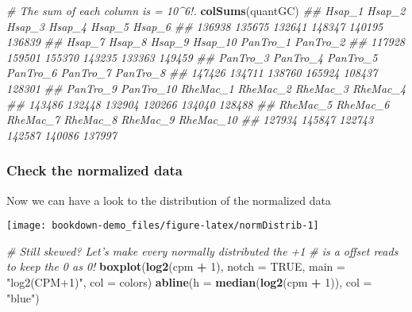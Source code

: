 \documentclass[]{book}
\newenvironment{Shaded}{\begin{snugshade}}{\end{snugshade}}
\newcommand{\CommentTok}[1]{\textcolor[rgb]{0.56,0.35,0.01}{\textit{#1}}}
\newcommand{\DataTypeTok}[1]{\textcolor[rgb]{0.13,0.29,0.53}{#1}}
\newcommand{\DecValTok}[1]{\textcolor[rgb]{0.00,0.00,0.81}{#1}}
\newcommand{\KeywordTok}[1]{\textcolor[rgb]{0.13,0.29,0.53}{\textbf{#1}}}
\newcommand{\NormalTok}[1]{#1}
\newcommand{\OperatorTok}[1]{\textcolor[rgb]{0.81,0.36,0.00}{\textbf{#1}}}
\newcommand{\OtherTok}[1]{\textcolor[rgb]{0.56,0.35,0.01}{#1}}
\newcommand{\StringTok}[1]{\textcolor[rgb]{0.31,0.60,0.02}{#1}}
\begin{document}
\begin{Shaded}
\begin{Highlighting}[]
\CommentTok{# The sum of each column is = 10^6!.}
\KeywordTok{colSums}\NormalTok{(quantGC)}
\CommentTok{##    Hsap_1    Hsap_2    Hsap_3    Hsap_4    Hsap_5    Hsap_6 }
\CommentTok{##    136938    135675    132641    148347    140195    136839 }
\CommentTok{##    Hsap_7    Hsap_8    Hsap_9   Hsap_10  PanTro_1  PanTro_2 }
\CommentTok{##    117928    159501    155370    143235    133363    149459 }
\CommentTok{##  PanTro_3  PanTro_4  PanTro_5  PanTro_6  PanTro_7  PanTro_8 }
\CommentTok{##    147426    134711    138760    165924    108437    128301 }
\CommentTok{##  PanTro_9 PanTro_10  RheMac_1  RheMac_2  RheMac_3  RheMac_4 }
\CommentTok{##    143486    132448    132904    120266    134040    128488 }
\CommentTok{##  RheMac_5  RheMac_6  RheMac_7  RheMac_8  RheMac_9 RheMac_10 }
\CommentTok{##    127934    145847    122743    142587    140086    137997}
\end{Highlighting}
\end{Shaded}

\hypertarget{check-the-normalized-data}{%
\subsubsection{Check the normalized data}\label{check-the-normalized-data}}

Now we can have a look to the distribution of the normalized data

\begin{Shaded}
\end{Shaded}

\begin{center}\texttt{[image: bookdown-demo\_files/figure-latex/normDistrib-1]} \end{center}

\begin{Shaded}
\begin{Highlighting}[]

\CommentTok{# Still skewed? Let's make every normally distributed the +1}
\CommentTok{# is a offset reads to keep the 0 as 0!}
\KeywordTok{boxplot}\NormalTok{(}\KeywordTok{log2}\NormalTok{(cpm }\OperatorTok{+}\StringTok{ }\DecValTok{1}\NormalTok{), }\DataTypeTok{notch =} \OtherTok{TRUE}\NormalTok{, }\DataTypeTok{main =} \StringTok{"log2(CPM+1)"}\NormalTok{, }\DataTypeTok{col =}\NormalTok{ colors)}
\KeywordTok{abline}\NormalTok{(}\DataTypeTok{h =} \KeywordTok{median}\NormalTok{(}\KeywordTok{log2}\NormalTok{(cpm }\OperatorTok{+}\StringTok{ }\DecValTok{1}\NormalTok{)), }\DataTypeTok{col =} \StringTok{"blue"}\NormalTok{)}
\end{Highlighting}
\end{Shaded}
\end{document}
